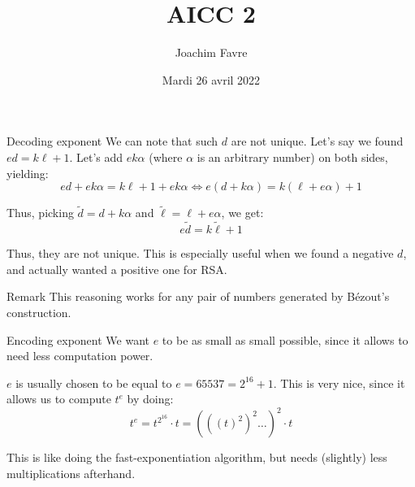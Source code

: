 \documentclass[a4paper]{article}
\title{AICC 2}
\author{Joachim Favre}
\date{Mardi 26 avril 2022}
\begin{document}
\maketitle


\begin{parag}{Decoding exponent}
    We can note that such $d$ are not unique. Let's say we found $ed = k \ell + 1$. Let's add $ek \alpha$ (where $\alpha$ is an arbitrary number) on both sides, yielding:  
    \[ed + ek \alpha = k \ell + 1 + ek \alpha \iff e\left(d + k \alpha\right) = k\left(\ell + e \alpha\right) + 1\]
    
    Thus, picking $\widetilde{d} = d + k\alpha$ and $\widetilde{\ell} = \ell + e\alpha$, we get: 
    \[e\widetilde{d} = k\widetilde{\ell} + 1\]
    
    Thus, they are not unique. This is especially useful when we found a negative $d$, and actually wanted a positive one for RSA.

    \begin{subparag}{Remark}
        This reasoning works for any pair of numbers generated by Bézout's construction.
    \end{subparag}
\end{parag}

\begin{parag}{Encoding exponent}
    We want $e$ to be as small as small possible, since it allows to need less computation power. 

    $e$ is usually chosen to be equal to $e = 65537 = 2^{16} + 1$. This is very nice, since it allows us to compute $t^e$ by doing:
    \[t^e = t^{2^{16}} \cdot t = \left(\left(\left(t\right)^2\right)^2 \ldots \right)^2 \cdot t\]

    This is like doing the fast-exponentiation algorithm, but needs (slightly) less multiplications afterhand.
\end{parag}
\end{document}
